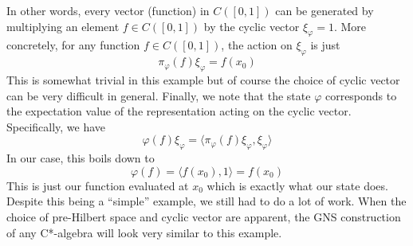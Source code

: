 \begin{example}
In other words, every vector (function) in $C([0,1])$ can be generated by multiplying
an element $f \in C([0,1])$ by the cyclic vector $\xi_\varphi = 1$. More concretely, for
any function $f \in C([0,1])$, the action on $\xi_\varphi$ is just
\begin{equation}
    \pi_\varphi(f)\xi_\varphi = f(x_0)
\end{equation}
This is somewhat trivial in this example but of course the choice of cyclic vector
can be very difficult in general. Finally, we note that the state  $\varphi$ corresponds
 to the expectation value of the representation acting on the cyclic vector.
Specifically, we have
\begin{equation}
    \varphi(f)\xi_\varphi = \langle \pi_\varphi (f) \xi_\varphi, \xi_\varphi \rangle
\end{equation}
In our case, this boils down to
\begin{equation}
    \varphi(f) = \langle f(x_0), 1 \rangle = f(x_0)
\end{equation}
This is just our function evaluated at $x_0$ which is exactly what our state does.
Despite this being a ``simple'' example, we still had to do a lot of work. When
the choice of pre-Hilbert space and cyclic vector are apparent, the GNS construction
of any C*-algebra will look very similar to this example.
\end{example}


